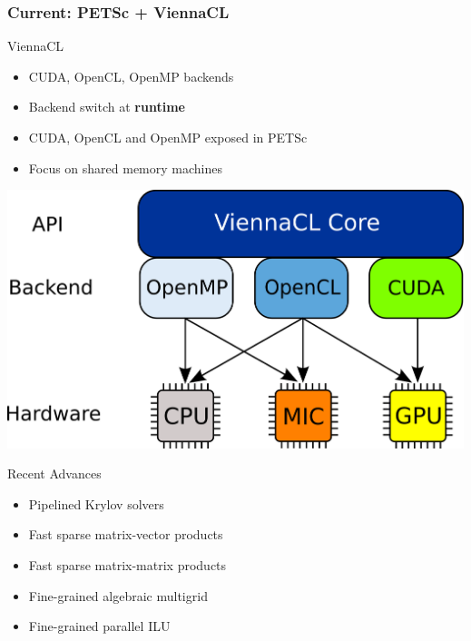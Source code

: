 \begin{frame}[fragile]
\frametitle{Current: PETSc + ViennaCL}

\begin{minipage}{0.58\textwidth}
  \begin{block}{ViennaCL}
  \begin{itemize}
   \item CUDA, OpenCL, OpenMP backends
   \item Backend switch at \textbf{runtime}
   \item CUDA, OpenCL and OpenMP exposed in PETSc
   \item Focus on shared memory machines
  \end{itemize}
  \end{block}
\end{minipage}
\begin{minipage}{0.4\textwidth}
   \includegraphics[width=0.999\textwidth]{figures/ViennaCL-arch}
\end{minipage}

  \vspace*{0.3cm}
  \begin{block}{Recent Advances}
  \begin{itemize}
   \item Pipelined Krylov solvers
   \item Fast sparse matrix-vector products
   \item Fast sparse matrix-matrix products
   \item Fine-grained algebraic multigrid
   \item Fine-grained parallel ILU
  \end{itemize}
  \end{block}

\end{frame}


